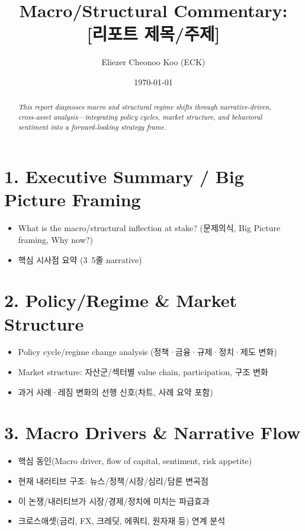 \documentclass[12pt]{article}
\title{Macro/Structural Commentary: \\ \textbf{[리포트 제목/주제]}}
\author{Eliezer Cheonoo Koo (ECK)}
\date{\today}
\begin{document}
\maketitle

\begin{abstract}
\noindent
\textit{This report diagnoses macro and structural regime shifts through narrative-driven, cross-asset analysis—integrating policy cycles, market structure, and behavioral sentiment into a forward-looking strategy frame.}
\end{abstract}

\section*{1. Executive Summary / Big Picture Framing}
\begin{itemize}[leftmargin=1.5em]
    \item What is the macro/structural inflection at stake? (문제의식, Big Picture framing, Why now?)
    \item 핵심 시사점 요약 (3~5줄 narrative)
\end{itemize}

\section*{2. Policy/Regime & Market Structure}
\begin{itemize}[leftmargin=1.5em]
    \item Policy cycle/regime change analysis (정책·금융·규제·정치·제도 변화)
    \item Market structure: 자산군/섹터별 value chain, participation, 구조 변화
    \item 과거 사례·레짐 변화의 선행 신호(차트, 사례 요약 포함)
\end{itemize}

\section*{3. Macro Drivers \& Narrative Flow}
\begin{itemize}[leftmargin=1.5em]
    \item 핵심 동인(Macro driver, flow of capital, sentiment, risk appetite)
    \item 현재 내러티브 구조: 뉴스/정책/시장/심리/담론 변곡점
    \item 이 논쟁/내러티브가 시장/경제/정치에 미치는 파급효과
    \item 크로스애셋(금리, FX, 크레딧, 에쿼티, 원자재 등) 연계 분석
\end{itemize}
\end{document}
